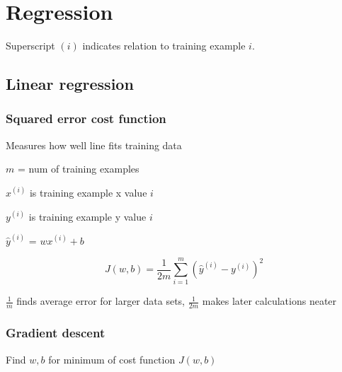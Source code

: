 \documentclass[12pt]{article}
\begin{document}
\newcommand*\dif{\mathop{}\!\mathrm{d}}


\newenvironment{subitemize}
{ \begin{itemize}[leftmargin=\parindent] }
{ \end{itemize} }

\newenvironment{subenumerate}
{ \begin{enumerate}[leftmargin=\parindent] }
{ \end{enumerate} }

\tableofcontents


\pagebreak

\section{Regression}

Superscript $(i)$ indicates relation to training example $i$.

\subsection{Linear regression}
\subsubsection{Squared error cost function}

Measures how well line fits training data

$m$ = num of training examples

$x^{(i)}$ is training example x value $i$

$y^{(i)}$ is training example y value $i$

$\hat y^{(i)}$ = $wx^{(i)} + b$

\[ J(w,b) = \frac{1}{2m} \sum_{i=1}^m ({\hat y}^{(i)} - y^{(i)})^2 \]

$\frac{1}{m}$ finds average error for larger data sets, $\frac{1}{2m}$ makes later calculations neater

\subsubsection{Gradient descent}

Find $w,b$ for minimum of cost function $J(w,b)$
\end{document}
